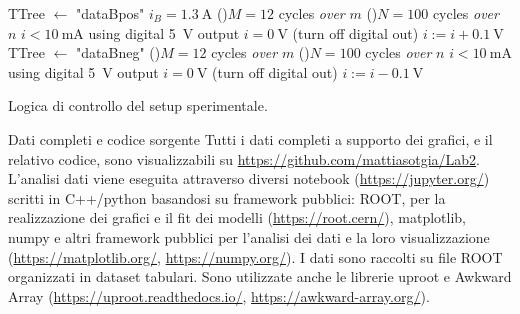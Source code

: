 \documentclass[
    prl,
    reprint, 
    superscriptaddress, 
    altaffilletter, 
    amsmath, 
    amssymb, 
    a4paper,
    varvw]{revtex4-2}
\begin{document}
\begin{algorithm}
    \DontPrintSemicolon
    \CreateMode TTree $\gets$ "dataBpos"\;
    \SetMode $i_B=\SI{1.3}{\ampere}$\;
    \For(){$M=12$ cycles \emph{over} $m$}{
        \For(){$N=100$ cycles \emph{over} $n$}{
            \SetMode $i<\SI{10}{\milli\ampere}$ using digital \SI{5}{\volt} output\;
            \SetMode $i=\SI{0}{\volt}$ (turn off digital out)\;
            \Inc $i:=i+\SI{0.1}{\volt}$
        }
    }
    \;
    \CreateMode TTree $\gets$ "dataBneg"\;
    \For(){$M=12$ cycles \emph{over} $m$}{
        \For(){$N=100$ cycles \emph{over} $n$}{
            \SetMode $i<\SI{10}{\milli\ampere}$ using digital \SI{5}{\volt} output\;
            \SetMode $i=\SI{0}{\volt}$ (turn off digital out)\;
            \Dec $i:=i-\SI{0.1}{\volt}$
        }
    }
    \vspace{0.5cm}
    \caption[]{Logica di controllo del setup sperimentale.}\label{alg:logic}
\end{algorithm}

%


\begin{methods}{D\lowercase{ati completi e codice sorgente}}
    Tutti i dati completi a supporto dei grafici, e il relativo codice, sono visualizzabili su \url{https://github.com/mattiasotgia/Lab2}. L'analisi dati viene eseguita attraverso diversi notebook (\url{https://jupyter.org/}) scritti in C++/python basandosi su framework pubblici: ROOT, per la realizzazione dei grafici e il fit dei modelli (\url{https://root.cern/}), matplotlib, numpy e altri framework pubblici per l'analisi dei dati e la loro visualizzazione (\url{https://matplotlib.org/}, \url{https://numpy.org/}). I dati sono raccolti su file ROOT organizzati in dataset tabulari. Sono utilizzate anche le librerie uproot e Awkward Array (\url{https://uproot.readthedocs.io/}, \url{https://awkward-array.org/}).
\end{methods}
\end{document}
